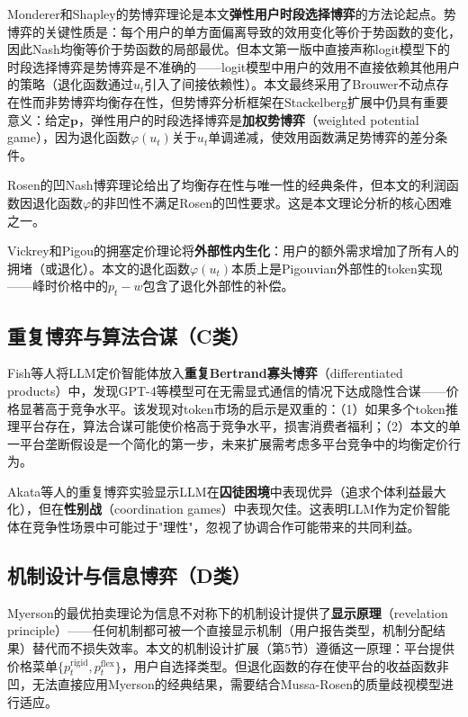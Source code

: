 \documentclass[11pt]{article}
\begin{document}
Monderer和Shapley\cite{monderer1996potential}的势博弈理论是本文\textbf{弹性用户时段选择博弈}的方法论起点。势博弈的关键性质是：每个用户的单方面偏离导致的效用变化等价于势函数的变化，因此Nash均衡等价于势函数的局部最优。但本文第一版中直接声称logit模型下的时段选择博弈是势博弈是不准确的——logit模型中用户的效用不直接依赖其他用户的策略（退化函数通过$u_t$引入了间接依赖性）。本文最终采用了Brouwer不动点存在性而非势博弈均衡存在性，但势博弈分析框架在Stackelberg扩展中仍具有重要意义：给定$\mathbf{p}$，弹性用户的时段选择博弈是\textbf{加权势博弈}（weighted potential game）\cite{mas-colell1984existence}，因为退化函数$\varphi(u_t)$关于$u_t$单调递减，使效用函数满足势博弈的差分条件。

Rosen\cite{rosen1965existence}的凹Nash博弈理论给出了均衡存在性与唯一性的经典条件，但本文的利润函数因退化函数$\varphi$的非凹性不满足Rosen的凹性要求。这是本文理论分析的核心困难之一。

Vickrey\cite{vickrey1969congestion}和Pigou\cite{pigou1920economics}的拥塞定价理论将\textbf{外部性内生化}：用户的额外需求增加了所有人的拥堵（或退化）。本文的退化函数$\varphi(u_t)$本质上是Pigouvian外部性的token实现——峰时价格中的$p_t - w$包含了退化外部性的补偿。

\subsection{重复博弈与算法合谋（C类）}

Fish等人\cite{fish2024algorithmic}将LLM定价智能体放入\textbf{重复Bertrand寡头博弈}（differentiated products）中，发现GPT-4等模型可在无需显式通信的情况下达成隐性合谋——价格显著高于竞争水平。该发现对token市场的启示是双重的：（1）如果多个token推理平台存在，算法合谋可能使价格高于竞争水平，损害消费者福利；（2）本文的单一平台垄断假设是一个简化的第一步，未来扩展需考虑多平台竞争中的均衡定价行为。

Akata等人\cite{akata2025playing}的重复博弈实验显示LLM在\textbf{囚徒困境}中表现优异（追求个体利益最大化），但在\textbf{性别战}（coordination games）中表现欠佳。这表明LLM作为定价智能体在竞争性场景中可能过于"理性"，忽视了协调合作可能带来的共同利益。

\subsection{机制设计与信息博弈（D类）}

Myerson\cite{myerson1981optimal}的最优拍卖理论为信息不对称下的机制设计提供了\textbf{显示原理}（revelation principle）——任何机制都可被一个直接显示机制（用户报告类型，机制分配结果）替代而不损失效率。本文的机制设计扩展（第5节）遵循这一原理：平台提供价格菜单$\{p_t^{\text{rigid}}, p_t^{\text{flex}}\}$，用户自选择类型。但退化函数的存在使平台的收益函数非凹，无法直接应用Myerson的经典结果，需要结合Mussa-Rosen\cite{mussa1978monopoly}的质量歧视模型进行适应。
\end{document}
